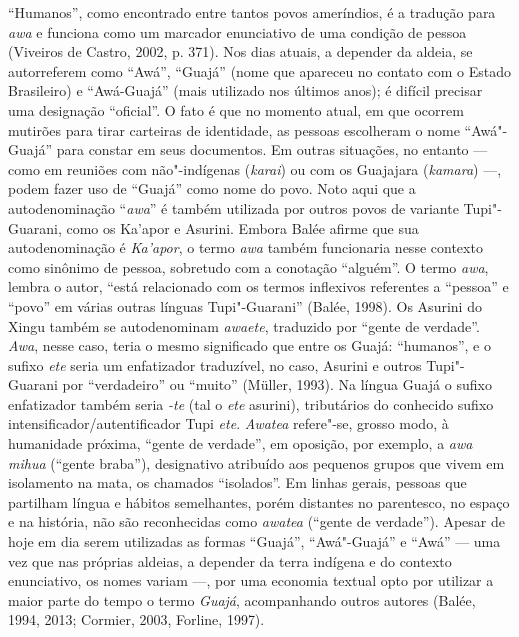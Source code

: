 ``Humanos'', como encontrado entre tantos povos ameríndios, é a tradução
para \emph{awa} e funciona como um marcador enunciativo de uma condição
de pessoa (Viveiros de Castro, 2002, p. 371). Nos dias atuais, a depender da
aldeia, se autorreferem como ``Awá'', ``Guajá'' (nome que apareceu no
contato com o Estado Brasileiro) e ``Awá-Guajá'' (mais utilizado nos
últimos anos); é difícil precisar uma designação ``oficial''. O fato é que
no momento atual, em que ocorrem mutirões para tirar carteiras de
identidade, as pessoas escolheram o nome ``Awá"-Guajá'' para constar em
seus documentos. Em outras situações, no entanto --- como em reuniões com
não"-indígenas (\emph{karai}) ou com os Guajajara (\emph{kamara}) ---,
podem fazer uso de ``Guajá'' como nome do povo. Noto aqui que a
autodenominação ``\emph{awa}'' é também utilizada por outros povos de
variante Tupi"-Guarani, como os Ka'apor e Asurini. Embora Balée afirme
que sua autodenominação é \emph{Ka'apor}, o termo \emph{awa} também
funcionaria nesse contexto como sinônimo de pessoa, sobretudo com a
conotação ``alguém''. O termo \emph{awa}, lembra o autor, ``está
relacionado com os termos inflexivos referentes a ``pessoa'' e ``povo'' em
várias outras línguas Tupi"-Guarani'' (Balée, 1998). Os Asurini do Xingu
também se autodenominam \emph{awaete}, traduzido por ``gente de verdade''.
\emph{Awa}, nesse caso, teria o mesmo significado que entre os Guajá:
``humanos'', e o sufixo \emph{ete} seria um enfatizador traduzível, no
caso, Asurini e outros Tupi"-Guarani por ``verdadeiro'' ou ``muito'' (Müller,
1993). Na língua Guajá o sufixo enfatizador também seria \emph{-te}
(tal o \emph{ete} asurini), tributários do conhecido sufixo
intensificador/autentificador Tupi \emph{ete}. \emph{Awatea} refere"-se,
grosso modo, à humanidade próxima, ``gente de verdade'', em oposição,
por exemplo, a \emph{awa mihua} (``gente braba''), designativo atribuído
aos pequenos grupos que vivem em isolamento na mata, os chamados
``isolados''. Em linhas gerais, pessoas que partilham língua e hábitos
semelhantes, porém distantes no parentesco, no espaço e na história, não
são reconhecidas como \emph{awatea} (``gente de verdade''). Apesar de hoje
em dia serem utilizadas as formas ``Guajá'', ``Awá"-Guajá'' e ``Awá'' ---
uma vez que nas próprias aldeias, a depender da terra indígena e do
contexto enunciativo, os nomes variam ---, por uma economia textual opto
por utilizar a maior parte do tempo o termo \emph{Guajá}, acompanhando
outros autores (Balée, 1994, 2013; Cormier, 2003, Forline, 1997).

